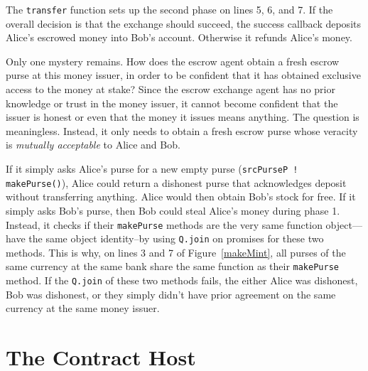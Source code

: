 \documentclass{llncs}
\begin{document}
The {\tt transfer} function sets up the second phase on lines 5, 6, and 7. If the overall decision is that the exchange should succeed,  the success callback deposits Alice's escrowed money into Bob's account. Otherwise it refunds Alice's money.

Only one mystery remains. How does the escrow agent obtain a fresh escrow purse at this money issuer, in order to be confident that it has obtained exclusive access to the money at stake? Since the escrow exchange agent has no prior knowledge or trust in the money issuer, it cannot become confident that the issuer is honest or even that the money it issues means anything. The question is meaningless. Instead, it only needs to obtain a fresh escrow purse whose veracity is \emph{mutually acceptable} to Alice and Bob.

If it simply asks Alice's purse for a new empty purse ({\tt srcPurseP ! makePurse()}), Alice could return a dishonest purse that acknowledges deposit without transferring anything. Alice would then obtain Bob's stock for free. If it simply asks Bob's purse, then Bob could steal Alice's money during phase 1. Instead, it checks if their {\tt makePurse} methods are the very same function object---have the same object identity--by using {\tt Q.join} on promises for these two methods. This is why, on lines 3 and 7 of Figure~\ref{makeMint}, all purses of the same currency at the same bank share the same function as their {\tt makePurse} method. If the {\tt Q.join} of these two methods fails, the either Alice was dishonest, Bob was dishonest, or they simply didn't have prior agreement on the same currency at the same money issuer.

\section{The Contract Host}
\label{sec:contract_host}
\end{document}
